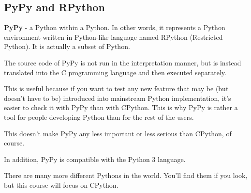 \documentclass[a4paper,10pt]{article}
\begin{document}
\subsection{PyPy and RPython}
\textbf{PyPy} - a Python within a Python. In other words, it represents a Python environment written in Python-like language named RPython (Restricted Python). It is actually a subset of Python.
\newline

The source code of PyPy is not run in the interpretation manner, but is instead translated into the C programming language and then executed separately.
\newline

This is useful because if you want to test any new feature that may be (but doesn't have to be) introduced into mainstream Python implementation, it's easier to check it with PyPy than with CPython. This is why PyPy is rather a tool for people developing Python than for the rest of the users.
\newline

This doesn't make PyPy any less important or less serious than CPython, of course.
\newline

In addition, PyPy is compatible with the Python 3 language.
\newline

There are many more different Pythons in the world. You'll find them if you look, but this course will focus on CPython.
\end{document}
